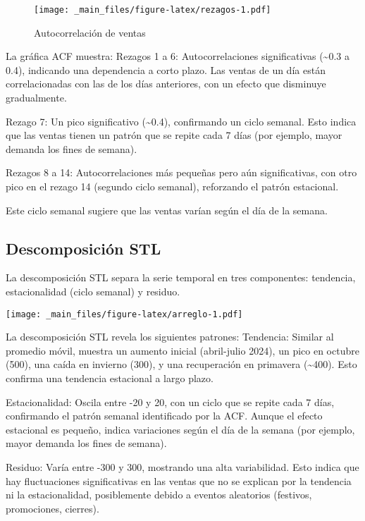 \documentclass[
]{book}
\begin{document}
\begin{figure}
\centering
\texttt{[image: \_main\_files/figure-latex/rezagos-1.pdf]}
\caption{\label{fig:rezagos}Autocorrelación de ventas}
\end{figure}

La gráfica ACF muestra:
Rezagos 1 a 6: Autocorrelaciones significativas (\textasciitilde0.3 a 0.4), indicando una dependencia a corto plazo. Las ventas de un día están correlacionadas con las de los días anteriores, con un efecto que disminuye gradualmente.

Rezago 7: Un pico significativo (\textasciitilde0.4), confirmando un ciclo semanal. Esto indica que las ventas tienen un patrón que se repite cada 7 días (por ejemplo, mayor demanda los fines de semana).

Rezagos 8 a 14: Autocorrelaciones más pequeñas pero aún significativas, con otro pico en el rezago 14 (segundo ciclo semanal), reforzando el patrón estacional.

Este ciclo semanal sugiere que las ventas varían según el día de la semana.

\subsection{Descomposición STL}\label{descomposiciuxf3n-stl}

La descomposición STL separa la serie temporal en tres componentes: tendencia, estacionalidad (ciclo semanal) y residuo.

\texttt{[image: \_main\_files/figure-latex/arreglo-1.pdf]}

La descomposición STL revela los siguientes patrones:
Tendencia: Similar al promedio móvil, muestra un aumento inicial (abril-julio 2024), un pico en octubre (500), una caída en invierno (300), y una recuperación en primavera (\textasciitilde400). Esto confirma una tendencia estacional a largo plazo.

Estacionalidad: Oscila entre -20 y 20, con un ciclo que se repite cada 7 días, confirmando el patrón semanal identificado por la ACF. Aunque el efecto estacional es pequeño, indica variaciones según el día de la semana (por ejemplo, mayor demanda los fines de semana).

Residuo: Varía entre -300 y 300, mostrando una alta variabilidad. Esto indica que hay fluctuaciones significativas en las ventas que no se explican por la tendencia ni la estacionalidad, posiblemente debido a eventos aleatorios (festivos, promociones, cierres).
\end{document}
